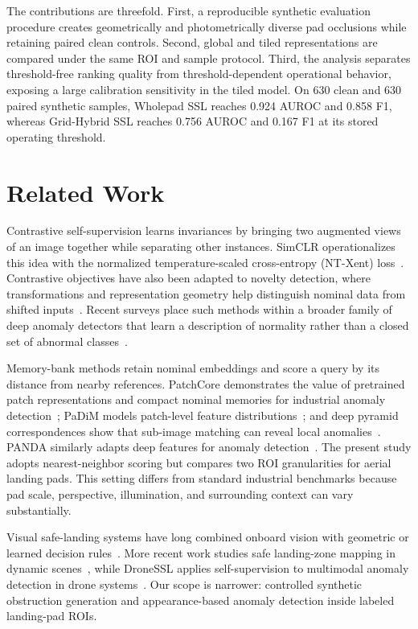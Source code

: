 \documentclass[sigconf,nonacm]{acmart}
\begin{document}
The contributions are threefold. First, a reproducible synthetic evaluation procedure creates geometrically and photometrically diverse pad occlusions while retaining paired clean controls. Second, global and tiled representations are compared under the same ROI and sample protocol. Third, the analysis separates threshold-free ranking quality from threshold-dependent operational behavior, exposing a large calibration sensitivity in the tiled model. On 630 clean and 630 paired synthetic samples, Wholepad SSL reaches 0.924 AUROC and 0.858 F1, whereas Grid-Hybrid SSL reaches 0.756 AUROC and 0.167 F1 at its stored operating threshold.

\section{Related Work}
Contrastive self-supervision learns invariances by bringing two augmented views of an image together while separating other instances. SimCLR operationalizes this idea with the normalized temperature-scaled cross-entropy (NT-Xent) loss~\cite{chen2020}. Contrastive objectives have also been adapted to novelty detection, where transformations and representation geometry help distinguish nominal data from shifted inputs~\cite{tack2020}. Recent surveys place such methods within a broader family of deep anomaly detectors that learn a description of normality rather than a closed set of abnormal classes~\cite{ruff2021,hojjati2022}.

Memory-bank methods retain nominal embeddings and score a query by its distance from nearby references. PatchCore demonstrates the value of pretrained patch representations and compact nominal memories for industrial anomaly detection~\cite{roth2022}; PaDiM models patch-level feature distributions~\cite{defard2021}; and deep pyramid correspondences show that sub-image matching can reveal local anomalies~\cite{cohen2020}. PANDA similarly adapts deep features for anomaly detection~\cite{reiss2021}. The present study adopts nearest-neighbor scoring but compares two ROI granularities for aerial landing pads. This setting differs from standard industrial benchmarks because pad scale, perspective, illumination, and surrounding context can vary substantially.

Visual safe-landing systems have long combined onboard vision with geometric or learned decision rules~\cite{yang2013}. More recent work studies safe landing-zone mapping in dynamic scenes~\cite{abdollahzadeh2026}, while DroneSSL applies self-supervision to multimodal anomaly detection in drone systems~\cite{akram2024}. Our scope is narrower: controlled synthetic obstruction generation and appearance-based anomaly detection inside labeled landing-pad ROIs.
\end{document}

